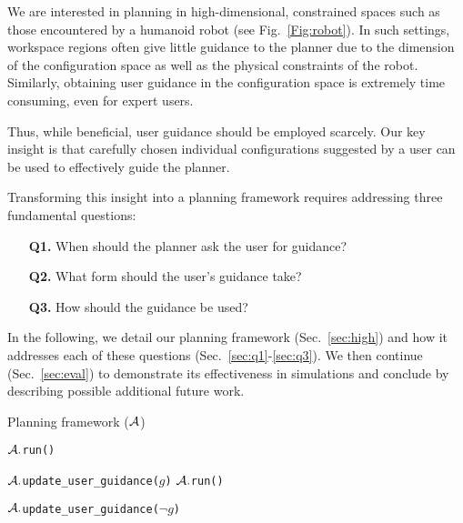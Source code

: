 \documentclass[conference]{IEEEtran}
\begin{document}
We are interested in planning in high-dimensional, constrained spaces such as those encountered by a humanoid robot (see Fig.~\ref{Fig:robot}).
In such settings, workspace regions often give little guidance to the planner due to the dimension of the configuration space as well as the physical constraints of the robot.
Similarly, obtaining user guidance in the configuration space is extremely time consuming, even for expert users.

Thus,  while beneficial, user guidance should be employed scarcely.
Our key insight is that carefully chosen individual configurations suggested by a user can be used to effectively guide the planner.


Transforming this insight into a planning framework requires addressing three fundamental questions:

\begin{itemize}
	\item[\textbf{Q1.}] When should the planner ask the user for guidance?
	\item[\textbf{Q2.}] What form should the user's guidance take?
	\item[\textbf{Q3.}] How should the guidance be used?
\end{itemize}
 
In the following, we detail our planning framework (Sec.~\ref{sec:high}) and how it addresses each of these questions (Sec.~\ref{sec:q1}-\ref{sec:q3}).
We then continue (Sec.~\ref{sec:eval}) to demonstrate its effectiveness in simulations and conclude by describing possible additional future work.

\begin{algorithm}[tb]
\caption{Planning framework ($\mathcal{A}$)}
\label{alg:main}	
\begin{algorithmic}[1]
\small
{} 
		\State $\mathcal{A}.$\texttt{run()}
	\EndWhile
	
	\State $\mathcal{A}.$\texttt{update\_user\_guidance($g$)}
		\State $\mathcal{A}.$\texttt{run()}
	\EndWhile

	\State $\mathcal{A}.$\texttt{update\_user\_guidance($\neg g$)}
\EndWhile
\end{algorithmic}
\end{algorithm}
\end{document}
